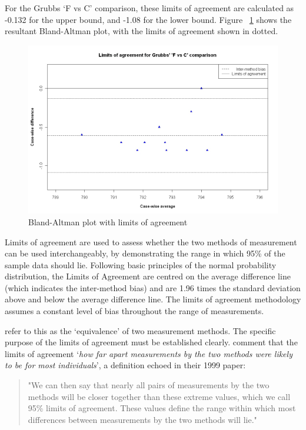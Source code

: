 \documentclass[12pt, a4paper]{report}
\theoremstyle{plain}
\theoremstyle{definition}
\theoremstyle{remark}
\begin{document}
	
	
	For the Grubbs `F vs C' comparison, these limits
	of agreement are calculated as -0.132 for the upper bound, and
	-1.08 for the lower bound. Figure ~\ref{GrubbsBAplot-noLOA} shows the resultant
	Bland-Altman plot, with the limits of agreement shown in dotted.
	
	
	\begin{figure}[h!]
		\begin{center}
			\includegraphics[width=125mm]{images/GrubbsBAplot-LOA.jpeg}
			\caption{Bland-Altman plot with limits of agreement}
			\label{GrubbsBAplot-noLOA}
		\end{center}
	\end{figure}
	
	Limits of agreement are used to assess whether the two methods of
	measurement can be used interchangeably, by demonstrating the range in which 95\% of the sample data should lie. Following basic principles of the normal probability distribution, the Limits of Agreement are centred on the average difference line (which indicates the inter-method bias) and are 1.96 times the standard deviation
	above and below the average difference line. The limits of agreement methodology assumes a constant level of bias throughout the range of measurements. 
	
	\citet{BA86} refer to
	this as the `equivalence' of two measurement methods. The specific purpose of the limits of
	agreement must be
	established clearly. \citet*{BA95} comment that the limits of agreement `\textit{how
		far apart measurements by the two methods were likely to be for
		most individuals}', a definition echoed in their 1999 paper:
	
	\begin{quote}"We can then say that nearly all pairs
		of measurements by the two methods will be closer together than
		these extreme values, which we call 95\% limits of agreement.
		These values define the range within which most differences
		between measurements by the two methods will lie."
	\end{quote}
	
\end{document}
